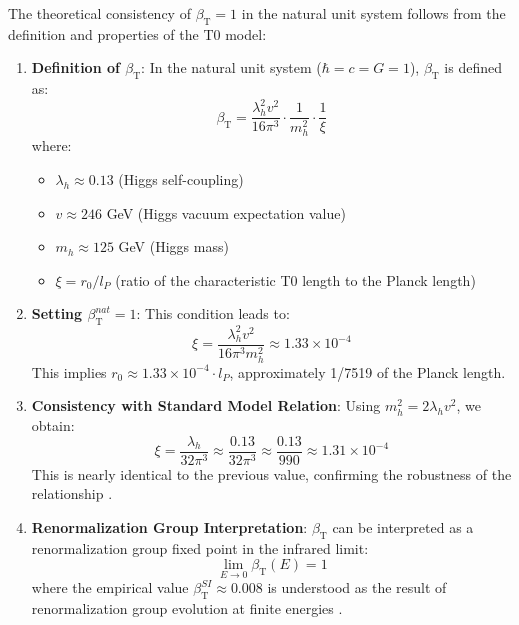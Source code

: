 \documentclass[12pt,a4paper]{article}
\newcommand{\betaT}{\beta_{\text{T}}}
\begin{document}
	The theoretical consistency of $\betaT = 1$ in the natural unit system follows from the definition and properties of the T0 model:
	
	\begin{enumerate}
		\item \textbf{Definition of $\betaT$}: In the natural unit system ($\hbar = c = G = 1$), $\betaT$ is defined as:
		\begin{equation}
			\betaT = \frac{\lambda_h^2 v^2}{16\pi^3} \cdot \frac{1}{m_h^2} \cdot \frac{1}{\xi}
		\end{equation}
		where:
		\begin{itemize}
			\item $\lambda_h \approx 0.13$ (Higgs self-coupling)
			\item $v \approx 246$ GeV (Higgs vacuum expectation value)
			\item $m_h \approx 125$ GeV (Higgs mass)
			\item $\xi = r_0/l_P$ (ratio of the characteristic T0 length to the Planck length)
		\end{itemize}
		
		\item \textbf{Setting $\betaT^{nat} = 1$}: This condition leads to:
		\begin{equation}
			\xi = \frac{\lambda_h^2 v^2}{16\pi^3 m_h^2} \approx 1.33 \times 10^{-4}
		\end{equation}
		This implies $r_0 \approx 1.33 \times 10^{-4} \cdot l_P$, approximately 1/7519 of the Planck length.
		
		\item \textbf{Consistency with Standard Model Relation}: Using $m_h^2 = 2\lambda_h v^2$, we obtain:
		\begin{equation}
			\xi = \frac{\lambda_h}{32\pi^3} \approx \frac{0.13}{32\pi^3} \approx \frac{0.13}{990} \approx 1.31 \times 10^{-4}
		\end{equation}
		This is nearly identical to the previous value, confirming the robustness of the relationship \cite{pascher_alphabeta_2025}.
		
		\item \textbf{Renormalization Group Interpretation}: $\betaT$ can be interpreted as a renormalization group fixed point in the infrared limit:
		\begin{equation}
			\lim_{E \to 0} \betaT(E) = 1
		\end{equation}
		where the empirical value $\betaT^{SI} \approx 0.008$ is understood as the result of renormalization group evolution at finite energies \cite{pascher_alphabeta_2025}.
	\end{enumerate}
	
\end{document}

